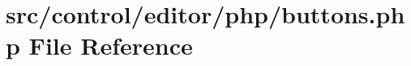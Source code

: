 \hypertarget{buttons_8php}{}\section{src/control/editor/php/buttons.php File Reference}
\label{buttons_8php}
